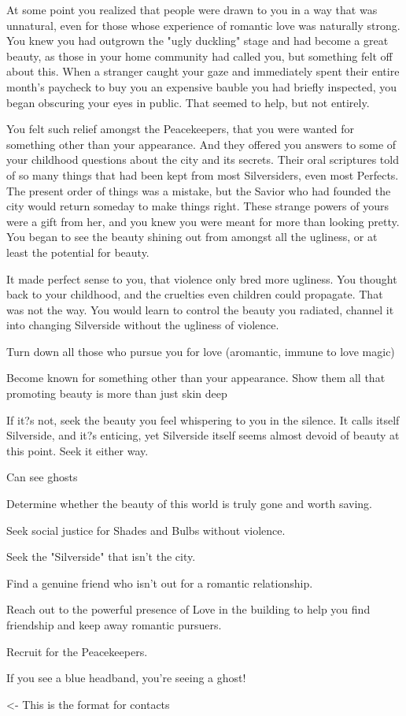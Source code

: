 \documentclass[char]{Silversiders}
\begin{document}
At some point you realized that people were drawn to you in a way that was unnatural, even for those whose experience of romantic love was naturally strong. You knew you had outgrown the "ugly duckling" stage and had become a great beauty, as those in your home community had called you, but something felt off about this. When a stranger caught your gaze and immediately spent their entire month's paycheck to buy you an expensive bauble you had briefly inspected, you began obscuring your eyes in public. That seemed to help, but not entirely.



You felt such relief amongst the Peacekeepers, that you were wanted for something other than your appearance. And they offered you answers to some of your childhood questions about the city and its secrets. Their oral scriptures told of so many things that had been kept from most Silversiders, even most Perfects. The present order of things was a mistake, but the Savior who had founded the city would return someday to make things right. These strange powers of yours were a gift from her, and you knew you were meant for more than looking pretty. You began to see the beauty shining out from amongst all the ugliness, or at least the potential for beauty.

It made perfect sense to you, that violence only bred more ugliness. You thought back to your childhood, and the cruelties even children could propagate. That was not the way. You would learn to control the beauty you radiated, channel it into changing Silverside without the ugliness of violence.

Turn down all those who pursue you for love (aromantic, immune to love magic)

Become known for something other than your appearance. Show them all that promoting beauty is more than just skin deep

If it?s not, seek the beauty you feel whispering to you in the silence. It calls itself Silverside, and it?s enticing, yet Silverside itself seems almost devoid of beauty at this point. Seek it either way.

Can see ghosts

\begin{itemz}[Goals]
	\item Determine whether the beauty of this world is truly gone and worth saving. 
	\item Seek social justice for Shades and Bulbs without violence.
	\item Seek the "Silverside" that isn't the city.
	\item Find a genuine friend who isn't out for a romantic relationship.
	\item Reach out to the powerful presence of Love in the building to help you find friendship and keep away romantic pursuers.
	\item Recruit for the Peacekeepers.
\end{itemz}

\begin{itemz}[Notes]
	\item If you see a blue headband, you're seeing a ghost!
\end{itemz}

\begin{contacts}
	\contact{\cTest{}} <- This is the format for contacts 
\end{contacts}
\end{document}
